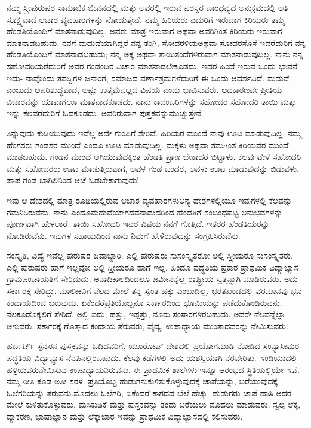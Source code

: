ನಮ್ಮ ಸ್ತ್ರೀಪುರುಷರ ಸಾಮಾಜಿಕ ಜೀವನದಲ್ಲಿ ಮತ್ತು ಅವರಲ್ಲಿ ಇರುವ ಪರಸ್ಪರ ಬಾಂಧವ್ಯದ ಅನುಕ್ರಮದಲ್ಲಿ ಅತಿ ಸೂಕ್ಷ್ಮವಾದ ಆಚಾರ ವ್ಯವಹಾರಗಳನ್ನು ನೋಡುತ್ತೇವೆ. ನಮ್ಮ ಹಿರಿಯರು ಎದುರಿಗೆ ಇರುವಾಗ ಕಿರಿಯರು ತಮ್ಮ ಹೆಂಡತಿಯೊಂದಿಗೆ ಮಾತನಾಡುವುದಿಲ್ಲ. ಅವರು ಮಾತ್ರ ಇರುವಾಗ ಅಥವಾ ಅವರಿಗಿಂತ ಕಿರಿಯರು ಇರುವಾಗ ಮಾತನಾಡಬಹುದು. ನನಗೆ ಮದುವೆಯಾಗಿದ್ದರೆ ನನ್ನ ತಂಗಿ, ಸೋದರಳಿಯ\break ಅಥವಾ ಸೋದರಸೊಸೆ ಇವರೆದುರಿಗೆ ನನ್ನ ಹೆಂಡತಿಯೊಂದಿಗೆ ಮಾತನಾಡಬಹುದು; ನನ್ನ ಅಕ್ಕ ಅಥವಾ ತಾಯಿತಂದೆಗಳಿರುವಾಗ ಮಾತನಾಡುವುದಿಲ್ಲ. ನಾನು ನನ್ನ ಸಹೋದರಿಯರೆದುರಿಗೆ ಅವರ ಗಂಡಂದಿರ ವಿಚಾರ ಮಾತನಾಡಲೇಕೂಡದು. ಇದರ ಹಿಂದೆ ಇರುವ ಒಂದು ಭಾವನೆ ಇದು- ನಾವೊಂದು ತಪಸ್ವಿಗಳ ಜನಾಂಗ, ಸಮಾಜದ ವರ್ಣಾಶ್ರಮ\-ಗಳೆದುರಿಗೆ ಈ ಒಂದು ಆದರ್ಶವಿದೆ. ಮದುವೆ ಎಂಬುದು ಅಪರಿಶುದ್ಧವಾದ, ಅಷ್ಟು ಉತ್ತಮವಲ್ಲದ ವಿಷಯ ಎಂದು ಭಾವಿಸುವರು. ಆದಕಾರಣವೇ ಪ್ರೀತಿಯ ವಿಚಾರವನ್ನು ಯಾವಾಗಲೂ ಮಾತನಾಡಕೂಡದು. ನಾನು ಕಾದಂಬರಿಗಳನ್ನು ಸಹೋದರ ಸಹೋದರಿ ತಾಯಿ ಮತ್ತು ಇನ್ನು ಕೆಲವರೆದುರಿಗೆ ಓದಕೂಡದು. ಅವರಿರುವಾಗ ಪುಸ್ತಕವನ್ನು\break ಮುಚ್ಚುತ್ತೇನೆ.

ತಿನ್ನುವುದು ಕುಡಿಯುವುದು ಇವೆಲ್ಲ ಅದೇ ಗುಂಪಿಗೆ ಸೇರಿವೆ. ಹಿರಿಯರ ಮುಂದೆ ನಾವು ಊಟ ಮಾಡುವುದಿಲ್ಲ. ನಮ್ಮ ಹೆಂಗಸರು ಗಂಡಸರ ಮುಂದೆ ಎಂದೂ ಊಟ ಮಾಡುವುದಿಲ್ಲ. ಮಕ್ಕಳು ಅಥವಾ ತಮಗಿಂತ ಕಿರಿಯವರ ಮುಂದೆ ಮಾಡಬಹುದು. ಗಂಡನ ಮುಂದೆ ಅಗಿಯುವುದಕ್ಕಿಂತ ಹೆಂಡತಿ ಪ್ರಾಣ ಬೇಕಾದರೆ ಬಿಟ್ಟಾಳು. ಕೆಲವು ವೇಳೆ ಸಹೋದರಿ ಮತ್ತು ಸಹೋದರರು ಊಟ ಮಾಡುತ್ತಿರುವಾಗ, ಅವಳ ಗಂಡ ಬಂದರೆ, ಅವಳು ಊಟ ಮಾಡುವುದನ್ನು ಬಿಡುವಳು. ಪಾಪ ಗಂಡ ಬಾಗಿಲಿನಿಂದ ಆಚೆ ಓಡಬೇಕಾಗುವುದು!

ಇವು ಆ ದೇಶದಲ್ಲಿ ಮಾತ್ರ ರೂಢಿಯಲ್ಲಿರುವ ಆಚಾರ ವ್ಯವಹಾರಗಳು\break ಅನ್ಯ ದೇಶಗಳಲ್ಲಿಯೂ ಇವುಗಳಲ್ಲಿ ಕೆಲವನ್ನು ಗಮನಿಸಿರುವೆನು. ನಾನು ಎಂದೂ\break ಮದುವೆಯಾಗದವನಾದುದರಿಂದ ಹೆಂಡತಿಗೆ ಸಂಬಂಧಪಟ್ಟ ಅನುಭವಗಳನ್ನು ಪೂರ್ಣವಾಗಿ ಹೇಳಲಾರೆ. ತಾಯಿ ಸಹೋದರಿ ಇವರ ವಿಷಯ ನನಗೆ ಗೊತ್ತಿದೆ. ಇತರರ ಹೆಂಡತಿಯರನ್ನು ನೋಡಿರುವೆನು. ಇವುಗಳ ಸಹಾಯದಿಂದ ನಾನು ನಿಮಗೆ ಹೇಳಿರುವುದನ್ನು ಸಂಗ್ರಹಿಸಿರುವೆನು.

ಸಂಸ್ಕೃತಿ, ವಿದ್ಯೆ ಇವೆಲ್ಲ ಪುರುಷರ ಜವಾಬ್ದಾರಿ. ಎಲ್ಲಿ ಪುರುಷರು ಸುಸಂಸ್ಕೃತರೋ ಅಲ್ಲಿ ಸ್ತ್ರೀಯರೂ ಸುಸಂಸ್ಕೃತರು. ಎಲ್ಲಿ ಪುರುಷರು ಹಾಗೆ ಇಲ್ಲವೋ ಅಲ್ಲಿ ಸ್ತ್ರೀಯರೂ ಹಾಗೆ ಇಲ್ಲ. ಹಿಂದೂ ಪದ್ಧತಿಯ ಪ್ರಕಾರ ಪ್ರಾಥಮಿಕ ವಿದ್ಯಾಭ್ಯಾಸ ಗ್ರಾಮಪಂಚಾಯತಿಗೆ ಸೇರಿದುದು. ಅನಾದಿಕಾಲದಿಂದಲೂ ಜಮೀನನ್ನೆಲ್ಲ ರಾಷ್ಟ್ರೀಯ ಸ್ವತ್ತನ್ನಾಗಿ ಮಾಡಿರುವರು. ಅದು ಸರ್ಕಾರಕ್ಕೆ ಸೇರಿದ್ದು. ಮಾಲೀಕನಿಗೆ ನೆಲದ ಮೇಲೆ ತನ್ನ ಸ್ವಂತ ಹಕ್ಕು ಎಂಬುದಿಲ್ಲ. ಭರತಖಂಡದಲ್ಲಿ ವರಮಾನವು ಭೂ ಕಂದಾಯದಿಂದ ಬರುವುದು. ಏಕೆಂದರೆ\break ಪ್ರತಿಯೊಬ್ಬನೂ ಸರ್ಕಾರದಿಂದ ಭೂಮಿಯನ್ನು ಪಡೆದುಕೊಂಡಿರುವನು. ನೆಲ\break ಕೂಡೊಕ್ಕಲಿಗೆ ಸೇರಿದೆ. ಅಲ್ಲಿ ಐದು, ಹತ್ತು, ಇಪ್ಪತ್ತು, ನೂರು ಸಂಸಾರಗಳಿರಬಹುದು. ಅವರೇ ನೆಲವನ್ನೆಲ್ಲಾ ಆಳುವರು. ಸರ್ಕಾರಕ್ಕೆ ಗೊತ್ತಾದ ಕಂದಾಯ ತೆರುವರು, ವೈದ್ಯ, ಉಪಾಧ್ಯಾಯ ಮುಂತಾದವರನ್ನು ನೇಮಿಸುವರು.

ಹರ್ಬರ್ಟ್​ ಸ್ಪೆನ್ಸರನ ಪುಸ್ತಕವನ್ನು ಓದಿದವರಿಗೆ, ಯೂರೋಪ್​ ದೇಶದಲ್ಲಿ ಪ್ರಯೋಗಮಾಡಿ ನೋಡಿದ ಸಂನ್ಯಾಸೀಮಠ ಪದ್ಧತಿಯ ವಿದ್ಯಾಭ್ಯಾಸ ನೆನಪಿನಲ್ಲಿರಬಹುದು. ಕೆಲವು ಕಡೆಗಳಲ್ಲಿ ಅದು ಯಶಸ್ವಿಯಾಗಿ ನೆರವೇರಿತು. ಇಂಡಿಯಾದಲ್ಲಿ ಹಳ್ಳಿಯವರು\break ನೇಮಿಸುವ ಉಪಾಧ್ಯಾಯನಿರುವನು. ಈ ಪ್ರಾಥಮಿಕ ಶಾಲೆಗಳು ಇನ್ನೂ ಆರಂಭದ ಸ್ಥಿತಿಯಲ್ಲಿಯೇ ಇವೆ. ನಮ್ಮ ರೀತಿ ಕೂಡ ಅತೀ ಸರಳ. ಪ್ರತಿಯೊಬ್ಬ ಹುಡುಗನು\break ಕುಳಿತುಕೊಳ್ಳುವುದಕ್ಕೆ ಚಾಪೆಯನ್ನು, ಬರೆಯುವುದಕ್ಕೆ ಓಲೆಗರಿಯನ್ನು ತರುವನು.\break ಮೊದಲು ಓಲೆಗರಿ, ಏಕೆಂದರೆ ಕಾಗದದ ಬೆಲೆ ಹೆಚ್ಚು. ಹುಡುಗರು ಚಾಪೆ ಹಾಸಿ ಅದರ ಮೇಲೆ ಕುಳಿತುಕೊಳ್ಳುವರು. ಮಸಿಕುಡಿಕೆ ಮತ್ತು ಪುಸ್ತಕವನ್ನು ತಂದು ಬರೆಯಲು ಮೊದಲು ಮಾಡುವರು. ಸ್ವಲ್ಪ ಲೆಕ್ಕ, ವ್ಯಾಕರಣ, ಭಾಷಾಜ್ಞಾನ ಮತ್ತು ಲೆಕ್ಕಾಚಾರ ಇವನ್ನು ಪ್ರಾಥಮಿಕ ವಿದ್ಯಾಭ್ಯಾಸದಲ್ಲಿ ಕಲಿಸುವರು.

